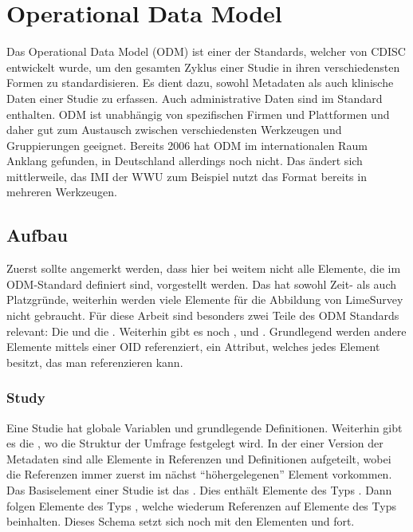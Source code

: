\section{Operational Data Model}
\label{m:odm}

Das Operational Data Model (ODM) ist einer der Standards, welcher von CDISC entwickelt wurde, um den gesamten Zyklus einer Studie in ihren verschiedensten Formen zu standardisieren.
Es dient dazu, sowohl Metadaten als auch klinische Daten einer Studie zu erfassen. Auch administrative Daten sind im Standard enthalten.
ODM ist unabhängig von spezifischen Firmen und Plattformen und daher gut zum Austausch zwischen verschiedensten Werkzeugen und Gruppierungen geeignet.
Bereits 2006 hat ODM im internationalen Raum Anklang gefunden, in Deutschland allerdings noch nicht.
Das ändert sich mittlerweile, das IMI der WWU zum Beispiel nutzt das Format bereits in mehreren Werkzeugen.

\subsection{Aufbau}

Zuerst sollte angemerkt werden, dass hier bei weitem nicht alle Elemente, die im ODM-Standard definiert sind, vorgestellt werden. Das hat sowohl Zeit- als auch Platzgründe, weiterhin werden viele Elemente für die Abbildung von LimeSurvey nicht gebraucht.
Für diese Arbeit sind besonders zwei Teile des ODM Standards relevant: Die  und die .
Weiterhin gibt es noch ,  und .
Grundlegend werden andere Elemente mittels einer OID referenziert, ein Attribut, welches jedes Element besitzt, das man referenzieren kann.

\subsubsection{Study}

Eine Studie hat globale Variablen und grundlegende Definitionen.
Weiterhin gibt es die , wo die Struktur der Umfrage festgelegt wird.
In der einer Version der Metadaten sind alle Elemente in Referenzen und Definitionen aufgeteilt, wobei die Referenzen immer zuerst im nächst \enquote{höhergelegenen} Element vorkommen.\\

Das Basiselement einer Studie ist das .
Dies enthält Elemente des Typs .
Dann folgen Elemente des Typs , welche wiederum Referenzen auf Elemente des Typs  beinhalten.
Dieses Schema setzt sich noch mit den Elementen  und  fort.\\


